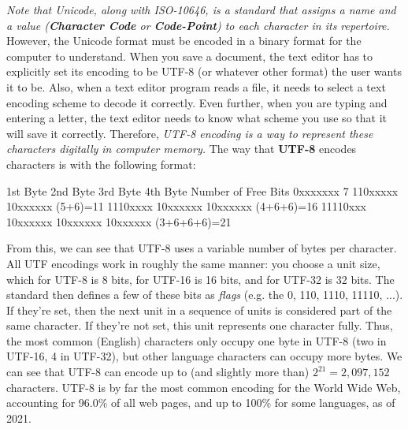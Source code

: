 \documentclass[a4paper, 12pt]{report}
\theoremstyle{remark}
\theoremstyle{definition}
\begin{document}
\textit{Note that Unicode, along with ISO-10646, is a standard that assigns a name and a value (\textbf{Character Code} or \textbf{Code-Point}) to each character in its repertoire.} However, the Unicode format must be encoded in a binary format for the computer to understand. When you save a document, the text editor has to explicitly set its encoding to be UTF-8 (or whatever other format) the user wants it to be. Also, when a text editor program reads a file, it needs to select a text encoding scheme to decode it correctly. Even further, when you are typing and entering a letter, the text editor needs to know what scheme you use so that it will save it correctly. Therefore, \textit{UTF-8 encoding is a way to represent these characters digitally in computer memory.} The way that \textbf{UTF-8} encodes characters is with the following format:
\begin{python}
1st Byte    2nd Byte    3rd Byte    4th Byte    Number of Free Bits   
0xxxxxxx                                                7             
110xxxxx    10xxxxxx                                (5+6)=11          
1110xxxx    10xxxxxx    10xxxxxx                  (4+6+6)=16         
11110xxx    10xxxxxx    10xxxxxx    10xxxxxx    (3+6+6+6)=21         
\end{python}
From this, we can see that UTF-8 uses a variable number of bytes per character. All UTF encodings work in roughly the same manner: you choose a unit size, which for UTF-8 is 8 bits, for UTF-16 is 16 bits, and for UTF-32 is 32 bits. The standard then defines a few of these bits as \textit{flags} (e.g. the 0, 110, 1110, 11110, ...). If they're set, then the next unit in a sequence of units is considered part of the same character. If they're not set, this unit represents one character fully. Thus, the most common (English) characters only occupy one byte in UTF-8 (two in UTF-16, 4 in UTF-32), but other language characters can occupy more bytes. We can see that UTF-8 can encode up to (and slightly more than) $2^{21} = 2,097,152$ characters. UTF-8 is by far the most common encoding for the World Wide Web, accounting for 96.0\% of all web pages, and up to 100\% for some languages, as of 2021.
\end{document}

